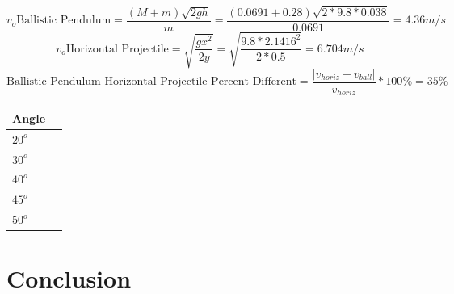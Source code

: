 \documentclass[11pt, titlepage]{article}
\begin{document}
$$v_o \text{Ballistic Pendulum} = \frac{(M+m)\sqrt{2gh}}{m} = \frac{(0.0691 + 0.28)\sqrt{2*9.8*0.038}}{0.0691} = 4.36 m/s$$
$$v_o \text{Horizontal Projectile} = \sqrt{\frac{gx^2}{2y}} = \sqrt{\frac{9.8*2.1416^2}{2*0.5}} = 6.704 m/s$$
$$\text{Ballistic Pendulum-Horizontal Projectile Percent Different} = \frac{|v_{horiz} - v_{ball}|}{v_{horiz}} * 100\% = 35\%$$ 

\begin{center}
\begin{tabular}
{|m{7em}|m{7em}|}
\hline
Angle & \\
\hline
$20^o$ & \\
\hline
$30^o$ & \\
\hline
$40^o$ & \\
\hline
$45^o$ & \\
\hline
$50^o$ & \\
\hline
\end{tabular}
\end{center}

\section*{Conclusion}
\end{document}
